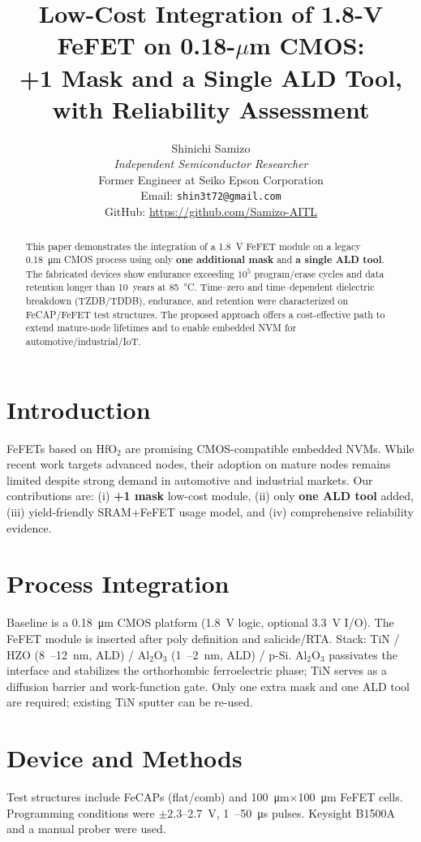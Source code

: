 \documentclass[conference]{IEEEtran}
\title{Low-Cost Integration of 1.8-V FeFET on 0.18-\(\mu\)m CMOS:\\
+1 Mask and a Single ALD Tool, with Reliability Assessment}
\author{%
Shinichi Samizo\\
\emph{Independent Semiconductor Researcher}\\
Former Engineer at Seiko Epson Corporation\\
Email: \texttt{shin3t72@gmail.com}\\
GitHub: \url{https://github.com/Samizo-AITL}
}
\begin{document}
\maketitle

\begin{abstract}
This paper demonstrates the integration of a \SI{1.8}{V} FeFET module on a legacy \SI{0.18}{\micro m} CMOS process using only \textbf{one additional mask} and \textbf{a single ALD tool}. 
The fabricated devices show endurance exceeding \(10^{5}\) program/erase cycles and data retention longer than 10~years at \SI{85}{\celsius}. 
Time–zero and time–dependent dielectric breakdown (TZDB/TDDB), endurance, and retention were characterized on FeCAP/FeFET test structures. 
The proposed approach offers a cost-effective path to extend mature-node lifetimes and to enable embedded NVM for automotive/industrial/IoT.
\end{abstract}

\section{Introduction}
FeFETs based on HfO\(_2\) are promising CMOS-compatible embedded NVMs. 
While recent work targets advanced nodes, their adoption on mature nodes remains limited despite strong demand in automotive and industrial markets. 
Our contributions are: (i) \textbf{+1 mask} low-cost module, (ii) only \textbf{one ALD tool} added, (iii) yield-friendly SRAM+FeFET usage model, and (iv) comprehensive reliability evidence.

\section{Process Integration}
Baseline is a \SI{0.18}{\micro m} CMOS platform (\SI{1.8}{V} logic, optional \SI{3.3}{V} I/O). 
The FeFET module is inserted after poly definition and salicide/RTA. 
Stack: TiN / HZO (\SI{8}{–}\SI{12}{nm}, ALD) / Al\(_2\)O\(_3\) (\SI{1}{–}\SI{2}{nm}, ALD) / p-Si. 
Al\(_2\)O\(_3\) passivates the interface and stabilizes the orthorhombic ferroelectric phase; TiN serves as a diffusion barrier and work-function gate. 
Only one extra mask and one ALD tool are required; existing TiN sputter can be re-used.

\section{Device and Methods}
Test structures include FeCAPs (flat/comb) and \SI{100}{\micro m}\(\times\)\SI{100}{\micro m} FeFET cells.
Programming conditions were \(\pm 2.3\)–\SI{2.7}{V}, \SI{1}{–}\SI{50}{\micro s} pulses. 
Keysight B1500A and a manual prober were used.
\end{document}
